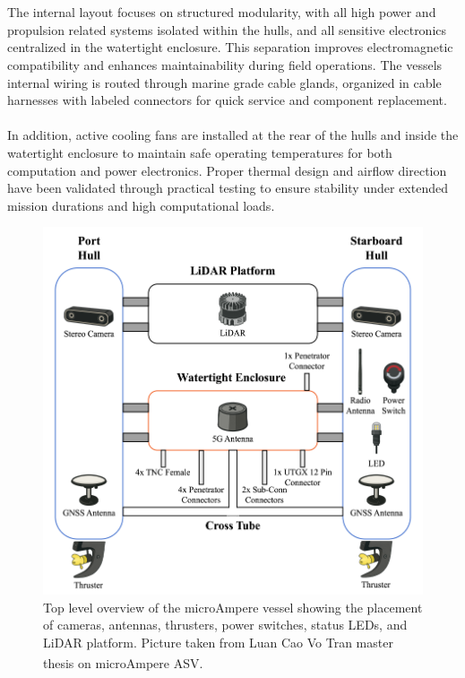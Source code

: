 \\ \\
The internal layout focuses on structured modularity, with all high power and propulsion related systems isolated within the hulls, and all sensitive electronics centralized in the watertight enclosure. This separation improves electromagnetic compatibility and enhances maintainability during field operations. The vessels internal wiring is routed through marine grade cable glands, organized in cable harnesses with labeled connectors for quick service and component replacement.
\\ \\
In addition, active cooling fans are installed at the rear of the hulls and inside the watertight enclosure to maintain safe operating temperatures for both computation and power electronics. Proper thermal design and airflow direction have been validated through practical testing to ensure stability under extended mission durations and high computational loads.
\begin{figure}[H]
    \centering
    \includegraphics[width=0.7\linewidth]{Pictures/Hardware/Layout/BoatTop.png}
    \caption{Top level overview of the microAmpere vessel showing the placement of cameras, antennas, thrusters, power switches, status LEDs, and LiDAR platform. Picture taken from Luan Cao Vo Tran master thesis on microAmpere ASV.\textsuperscript{\cite{microAmpere_hardware_master_thesis1}}}
    \label{fig:microAmpere-layout-top}
\end{figure}
